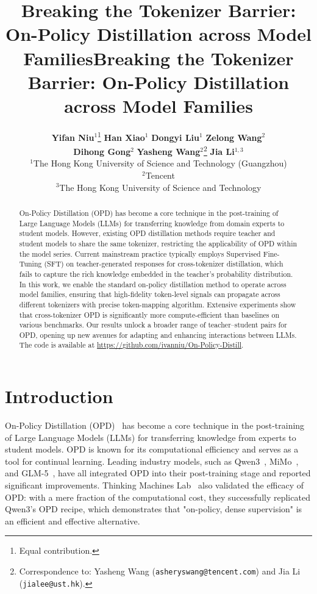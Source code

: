 \documentclass{article}
\title{Breaking the Tokenizer Barrier: On-Policy Distillation across Model Families}
\title{Breaking the Tokenizer Barrier: On-Policy Distillation across Model Families}
\author{%
  \textbf{Yifan Niu$^{1}$}\thanks{Equal contribution.} \quad
  \textbf{Han Xiao$^{1}$}\footnotemark[1] \quad
  \textbf{Dongyi Liu$^{1}$} \quad
  \textbf{Zelong Wang$^{2}$}
  \\
  \textbf{Dihong Gong$^{2}$} \quad
  \textbf{Yasheng Wang$^{2}$}\thanks{Correspondence to: Yasheng Wang (\texttt{asheryswang@tencent.com}) and Jia Li (\texttt{jialee@ust.hk}).} \quad
  \textbf{Jia Li$^{1,3}$}\footnotemark[2]
  \\
  $^{1}$The Hong Kong University of Science and Technology (Guangzhou)
  \\
  $^{2}$Tencent
  \\
  $^{3}$The Hong Kong University of Science and Technology
}
\theoremstyle{plain}
\theoremstyle{definition}
\theoremstyle{remark}
\begin{document}
\maketitle


\begin{abstract}
On-Policy Distillation (OPD) has become a core technique in the post-training of Large Language Models (LLMs) for transferring knowledge from domain experts to student models. However, existing OPD distillation methods require teacher and student models to share the same tokenizer, restricting the applicability of OPD within the model series. Current mainstream practice typically employs Supervised Fine-Tuning (SFT) on teacher-generated responses for cross-tokenizer distillation, which fails to capture the rich knowledge embedded in the teacher's probability distribution. In this work, we enable the standard on-policy distillation method to operate across model families, ensuring that high-fidelity token-level signals can propagate across different tokenizers with precise token-mapping algorithm. Extensive experiments show that cross-tokenizer OPD is significantly more compute-efficient than baselines on various benchmarks. Our results unlock a broader range of teacher–student pairs for OPD, opening up new avenues for adapting and enhancing interactions between LLMs. The code is available at \href{https://github.com/ivanniu/On-Policy-Distill}{https://github.com/ivanniu/On-Policy-Distill}.
\end{abstract}



\section{Introduction}

On-Policy Distillation (OPD)~\cite{zhao2026selfdistilledreasoneronpolicyselfdistillation,yang2026learningteachergeneralizedonpolicy,sdpo2026reinforcementlearningselfdistillation} has become a core technique in the post-training of Large Language Models (LLMs) for transferring knowledge from experts to student models. OPD is known for its computational efficiency and serves as a tool for continual learning. Leading industry models, such as Qwen3~\cite{yang2025qwen3technicalreport}, MiMo~\cite{coreteam2026mimov2flashtechnicalreport}, and GLM-5~\cite{glm5team2026glm5vibecodingagentic}, have all integrated OPD into their post-training stage and reported significant improvements.  Thinking Machines Lab~\cite{lu2025onpolicydistillation} also validated the efficacy of OPD: with a mere fraction of the computational cost, they successfully replicated Qwen3’s OPD recipe, which demonstrates that "on-policy, dense supervision" is an efficient and effective alternative.
\end{document}
